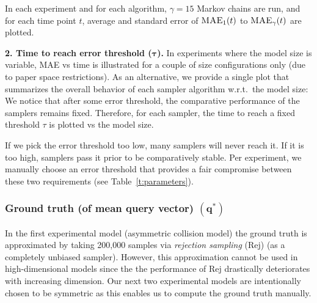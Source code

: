 \documentclass[]{article}
\newcommand{\bvec}[1]{\textbf{#1}}
\begin{document}
In each experiment and for each algorithm, $\gamma = 15$ Markov chains are run,  and for each time point $t$,
average and standard error of %
$\textsc{MAE}_{1}(t)$ to $\textsc{MAE}_{\gamma}(t)$
are plotted. 

{\bf 2. Time to reach error threshold ($\boldsymbol\tau$).}
In experiments where the model size is variable,
MAE vs time is illustrated for a couple of size configurations only
(due to paper space restrictions). 
As an alternative, we provide a single plot that summarizes the overall behavior of each sampler algorithm w.r.t.\ the model size:
We notice that after some error threshold, the comparative performance of the samplers remains fixed.
Therefore, for each sampler, the time to reach a fixed threshold $\tau$ is plotted vs the model size.

If we pick the error threshold too low, many samplers will never reach it. 
If it is too high, samplers pass it prior to be comparatively stable. 
Per experiment, we manually choose  an error threshold that provides a fair compromise between these two requirements
(see Table~\ref{t:parameters}).

\subsubsection*{Ground truth (of mean query vector) $(\bvec{q}^*)$}
In the first experimental model (asymmetric collision model)
the ground truth is approximated by taking 200,000 samples via \emph{rejection sampling} (Rej)
(as a completely unbiased sampler).
However, this approximation cannot be used in high-dimensional models
since the the performance of Rej drastically deteriorates with increasing dimension.
Our next two experimental models are intentionally chosen to be symmetric
as this enables us to compute the ground truth manually.%
\end{document}

